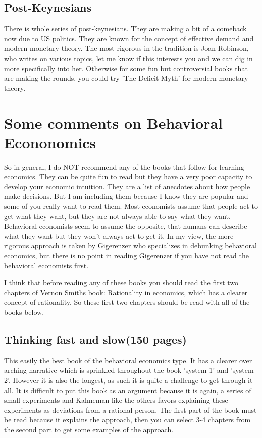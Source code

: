 \documentclass[12pt]{report}
\numberwithin{equation}{section}
\begin{document}
\subsection*{Post-Keynesians}

There is whole series of post-keynesians. They are making a bit of a comeback now due to US politics. They are known for the concept of effective demand and modern monetary theory. The most rigorous in the tradition is Joan Robinson, who writes on various topics, let me know if this interests you and we can dig in more specifically into her. Otherwise for some fun but controversial books that are making the rounds, you could try 'The Deficit Myth' for modern monetary theory. 

\section*{Some comments on Behavioral Econonomics}

So in general, I do NOT recommend any of the books that follow for learning economics. They can be quite fun to read but they have a very poor capacity to develop your economic intuition. They are a list of anecdotes about how people make decisions. But I am including them because I know they are popular and some of you really want to read them. Most economists assume that people act to get what they want, but they are not always able to say what they want. Behavioral economists seem to assume the opposite, that humans can describe what they want but they won't always act to get it. In my view, the more rigorous approach is taken by Gigerenzer who specializes in debunking behavioral economics, but there is no point in reading Gigerenzer if you have not read the behavioral economists first.  

I think that before reading any of these books you should read the first two chapters of Vernon Smiths book: Rationality in economics, which has a clearer concept of rationality. So these first two chapters should be read with all of the books below. 

\subsection*{Thinking fast and slow(150 pages)}

This easily the best book of the behavioral economics type. It has a clearer over arching narrative which is sprinkled throughout the book 'system 1' and 'system 2'. However it is also the longest, as such it is quite a challenge to get through it all. It is difficult to put this book as an argument because it is again, a series of small experiments and Kahneman like the others favors explaining these experiments as deviations from a rational person. The first part of the book must be read because it explains the approach, then you can select 3-4 chapters from the second part to get some examples of the approach. 
\end{document}
